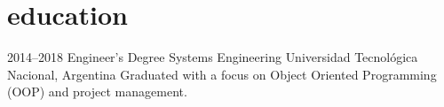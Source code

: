 \documentclass[a4paper,nocolors]{friggeri-cv}
\begin{document}

\section{education}

\begin{entrylist}


\entry
{2014--2018}
{Engineer’s Degree {\normalfont Systems Engineering}}
{Universidad Tecnológica Nacional, Argentina}
{Graduated with a focus on Object Oriented Programming (OOP) and project management.}

\end{entrylist}

\newpage

\end{document}

